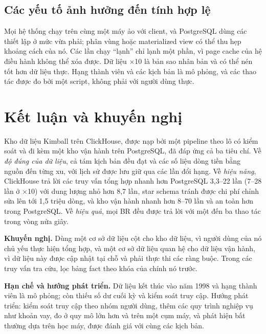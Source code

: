 \documentclass[peerreview]{IEEEtran}
\begin{document}
\subsection{Các yếu tố ảnh hưởng đến tính hợp lệ}
Mọi hệ thống chạy trên cùng một máy ảo với client, và PostgreSQL dùng các thiết lập ở mức
vừa phải; phân vùng hoặc materialized view có thể thu hẹp khoảng cách của nó. Các lần chạy
``lạnh'' chỉ lạnh một phần, vì page cache của hệ điều hành không thể xóa được. Dữ liệu
$\times$10 là bản sao nhân bản và có thể nén tốt hơn dữ liệu thực. Hạng thành viên và các
kịch bản là mô phỏng, và các thao tác được đo bởi một script, không phải với người dùng thực.


\section{Kết luận và khuyến nghị}
\label{sec:conclusion}

Kho dữ liệu Kimball trên ClickHouse, được nạp bởi một pipeline theo lô có kiểm soát và đi
kèm một kho vận hành trên PostgreSQL, đã đáp ứng cả ba tiêu chí. Về \emph{độ đúng của dữ
liệu}, cả tám kịch bản đều đạt và các số liệu dòng tiền bằng nguồn đến từng xu, với lịch sử
được lưu giữ qua các lần đổi hạng. Về \emph{hiệu năng}, ClickHouse trả lời các truy vấn tổng
hợp nhanh hơn PostgreSQL 3,3--22 lần (7--28 lần ở $\times$10) với dung lượng nhỏ hơn 8,7 lần,
star schema tránh được chi phí chỉnh sửa lên tới 1,5 triệu dòng, và kho vận hành nhanh hơn
8--70 lần và an toàn hơn trong PostgreSQL. Về \emph{hiệu quả}, mọi BR đều được trả lời với
một đến ba thao tác trong vòng nửa giây.

\textbf{Khuyến nghị.} Dùng một cơ sở dữ liệu cột cho kho dữ liệu, vì người dùng của nó chủ
yếu thực hiện tổng hợp, và một cơ sở dữ liệu quan hệ cho dữ liệu vận hành, vì dữ liệu này
được cập nhật tại chỗ và phải thực thi các ràng buộc. Trong các truy vấn tra cứu, lọc bảng
fact theo khóa của chính nó trước.

\textbf{Hạn chế và hướng phát triển.} Dữ liệu kết thúc vào năm 1998 và hạng thành viên là mô
phỏng; còn thiếu số dư cuối kỳ và kiểm soát truy cập. Hướng phát triển: kiểm soát truy cập
theo nhóm người dùng, thêm các quy trình nghiệp vụ như khoản vay, đo ở quy mô lớn hơn và trên
một cụm máy, và phát hiện bất thường dựa trên học máy, được đánh giá với cùng các kịch bản.


\appendices
\end{document}
